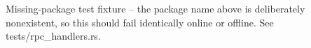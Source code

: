 \documentclass{article}
\begin{document}
Missing-package test fixture -- the package name above is deliberately nonexistent, so this
should fail identically online or offline. See tests/rpc_handlers.rs.
\end{document}
